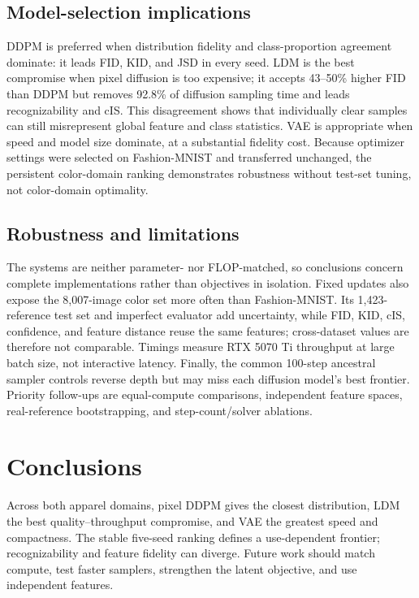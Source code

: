 \documentclass{article}
\begin{document}
\subsection{Model-selection implications}
DDPM is preferred when distribution fidelity and class-proportion agreement dominate: it leads FID, KID, and JSD in every seed. LDM is the best compromise when pixel diffusion is too expensive; it accepts 43--50\% higher FID than DDPM but removes 92.8\% of diffusion sampling time and leads recognizability and cIS. This disagreement shows that individually clear samples can still misrepresent global feature and class statistics. VAE is appropriate when speed and model size dominate, at a substantial fidelity cost. Because optimizer settings were selected on Fashion-MNIST and transferred unchanged, the persistent color-domain ranking demonstrates robustness without test-set tuning, not color-domain optimality.

\subsection{Robustness and limitations}
The systems are neither parameter- nor FLOP-matched, so conclusions concern complete implementations rather than objectives in isolation. Fixed updates also expose the 8,007-image color set more often than Fashion-MNIST. Its 1,423-reference test set and imperfect evaluator add uncertainty, while FID, KID, cIS, confidence, and feature distance reuse the same features; cross-dataset values are therefore not comparable. Timings measure RTX 5070 Ti throughput at large batch size, not interactive latency. Finally, the common 100-step ancestral sampler controls reverse depth but may miss each diffusion model's best frontier. Priority follow-ups are equal-compute comparisons, independent feature spaces, real-reference bootstrapping, and step-count/solver ablations.

\section{Conclusions}
Across both apparel domains, pixel DDPM gives the closest distribution, LDM the best quality--throughput compromise, and VAE the greatest speed and compactness. The stable five-seed ranking defines a use-dependent frontier; recognizability and feature fidelity can diverge. Future work should match compute, test faster samplers, strengthen the latent objective, and use independent features.
\end{document}
